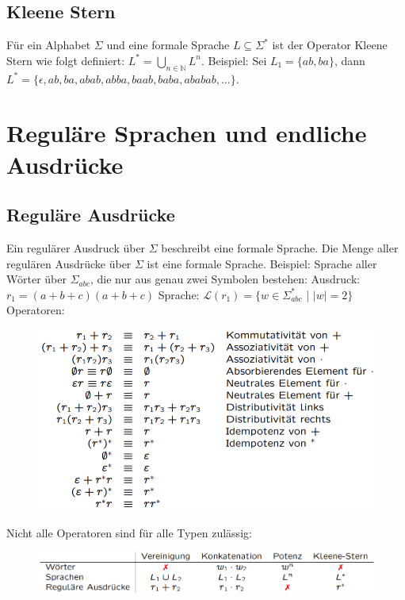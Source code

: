 \documentclass[12pt,a4paper]{article}
\begin{document}
\subsection{Kleene Stern}
Für ein Alphabet $\varSigma$ und eine formale Sprache $L \subseteq \varSigma^*$ ist der Operator Kleene Stern wie folgt definiert: $L^* = \underset{n \in \mathbb{N}}{\bigcup} L^n$.\newline \newline
Beispiel: Sei $L_1 = \{ ab, ba\}$, dann $L^* = \{\epsilon, ab, ba, abab, abba, baab, baba, ababab, ...\}$.

\section{Reguläre Sprachen und endliche Ausdrücke}
\subsection{Reguläre Ausdrücke}
Ein regulärer Ausdruck über $\varSigma$ beschreibt eine formale Sprache.\newline
Die Menge aller regulären Ausdrücke über $\varSigma$ ist eine formale Sprache.\newline\newline
Beispiel: Sprache aller Wörter über $\varSigma_{abc}$, die nur aus genau zwei Symbolen bestehen:\newline
Ausdruck: $r_1 = (a + b + c)(a + b + c)$\newline
Sprache: $\mathcal{L}(r_1) = \{ w \in \varSigma_{abc}^*$ | $|w| = 2\}$\newpage
\noindent Operatoren:
\begin{center}
	\begin{figure}[!h]
		\includegraphics[width=\textwidth]{Bilder/RegulaereAusdruecke_Operatoren.PNG}
	\end{figure}
\end{center}
Nicht alle Operatoren sind für alle Typen zulässig:
\begin{center}
	\begin{figure}[!h]
		\includegraphics[width=\textwidth]{Bilder/Zulaessige_Operatoren.PNG}
	\end{figure}
\end{center}
\end{document}
